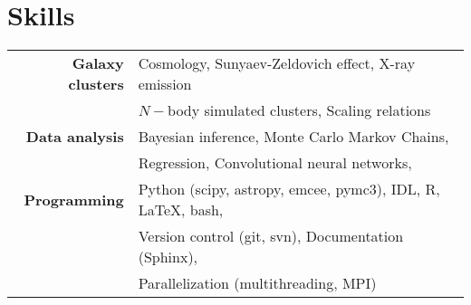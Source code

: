 \section{Skills}\label{skills}

\begin{table}[H]
    {\def\arraystretch{1.}\tabcolsep=5pt
        \begin{tabular}{r l}

    \textbf{Galaxy clusters}
        & Cosmology, Sunyaev-Zeldovich effect, X-ray emission \\
        & $N-$body simulated clusters, Scaling relations \\[5pt]
    \textbf{Data analysis}
        & Bayesian inference, Monte Carlo Markov Chains, \\
        & Regression, Convolutional neural networks, \\[5pt]
    \textbf{Programming}
        & Python (scipy, astropy, emcee, pymc3), IDL, R, %
            \LaTeX, bash, \\
        & Version control (git, svn), Documentation (Sphinx), \\
        & Parallelization (multithreading, MPI) \\

    \end{tabular}}
\end{table}
